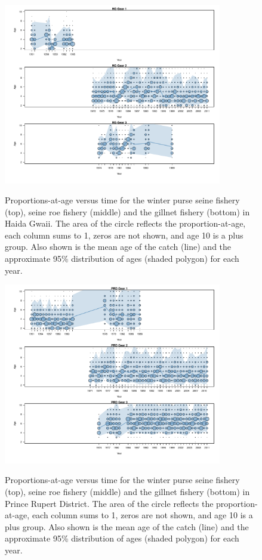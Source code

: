 \begin{figure}
	\centering
	\includegraphics[width=0.85\textwidth]{../Figs/iscam_fig_AgeCompsHG.pdf}\\
	\caption{Proportions-at-age versus time for the winter purse seine fishery (top), seine roe fishery (middle) and the gillnet fishery (bottom) in Haida Gwaii.  The area of the circle reflects the proportion-at-age, each column sums to 1, zeros are not shown, and age 10 is a plus group. Also shown is the mean age of the catch (line) and the approximate 95\% distribution of ages (shaded polygon) for each year.}\label{FigAgeCompsHG}
\end{figure}

\begin{figure}
	\centering
	\includegraphics[width=0.85\textwidth]{../Figs/iscam_fig_AgeCompsPRD.pdf}\\
	\caption{Proportions-at-age versus time for the winter purse seine fishery (top), seine roe fishery (middle) and the gillnet fishery (bottom) in Prince Rupert District.  The area of the circle reflects the proportion-at-age, each column sums to 1, zeros are not shown, and age 10 is a plus group. Also shown is the mean age of the catch (line) and the approximate 95\% distribution of ages (shaded polygon) for each year.}\label{FigAgeCompsPRD}
\end{figure}

